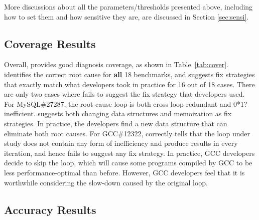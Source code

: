 More discussions about all the parameters/thresholds presented above, including
how to set them and how sensitive they are, are discussed in Section
\ref{sec:sensi}. 

\subsection{Coverage Results}
\label{sec:coverage}
Overall, \Tool provides good diagnosis coverage, as shown in Table~\ref{tab:cover}. 
\Tool identifies the correct root cause for \textbf{all} 18 benchmarks, and 
suggests fix strategies that exactly match what developers took in practice
for 16 out of 18 cases. There are only two cases where \Tool fails to suggest
the fix strategy that developers used. For MySQL\#27287, the root-cause loop
is both cross-loop redundant and 0*1? inefficient. \Tool suggests both changing
data structures and memoization as fix strategies. In practice, the developers
find a new data structure that can eliminate both root causes.
For GCC\#12322, \Tool correctly tells that the loop under study
does not contain any form of inefficiency and produce results in every 
iteration, and hence fails to suggest any fix strategy. In practice, GCC
developers decide to skip the loop, which will cause some programs compiled by
GCC
to be less performance-optimal than before. However, GCC developers feel
that it is worthwhile considering the slow-down caused by the original loop.

\subsection{Accuracy Results}
\label{sec:result_acc}

